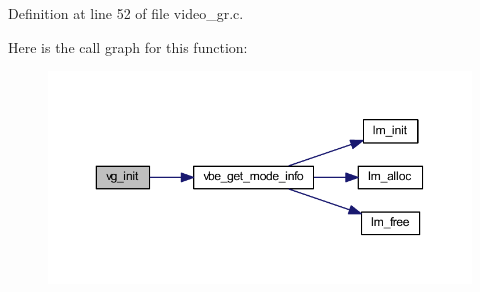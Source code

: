 Definition at line 52 of file video\+\_\+gr.\+c.



Here is the call graph for this function\+:\nopagebreak
\begin{figure}[H]
\begin{center}
\leavevmode
\includegraphics[width=350pt]{group__video__gr_gacef21667c79365d57a084bed994c2189_cgraph}
\end{center}
\end{figure}


